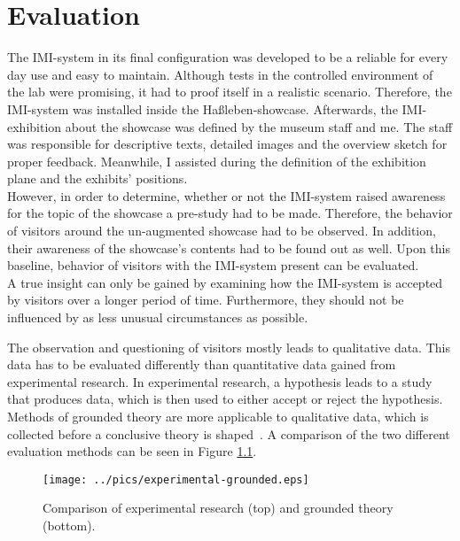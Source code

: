 \chapter{Evaluation}
\label{evaluation}

The \ac{IMI}-system in its final configuration was developed to be a reliable for every day use and easy to maintain. Although tests in the controlled environment of the lab were promising, it had to proof itself in a realistic scenario. Therefore, the \ac{IMI}-system was installed inside the Haßleben-showcase. Afterwards, the \ac{IMI}-exhibition about the showcase was defined by the museum staff and me. The staff was responsible for descriptive texts, detailed images and the overview sketch for proper feedback. Meanwhile, I assisted during the definition of the exhibition plane and the exhibits' positions.
\\
However, in order to determine, whether or not the \ac{IMI}-system raised awareness for the topic of the showcase a pre-study had to be made. Therefore, the behavior of visitors around the un-augmented showcase had to be observed. In addition, their awareness of the showcase's contents had to be found out as well. Upon this baseline, behavior of visitors with the \ac{IMI}-system present can be evaluated.
\\
A true insight can only be gained by examining how the \ac{IMI}-system is accepted by visitors over a longer period of time. Furthermore, they should not be influenced by as less unusual circumstances as possible.

The observation and questioning of visitors mostly leads to qualitative data. This data has to be evaluated differently than quantitative data gained from experimental research. In experimental research, a hypothesis leads to a study that produces data, which is then used to either accept or reject the hypothesis. Methods of grounded theory are more applicable to qualitative data, which is collected before a conclusive theory is shaped~\cite{GroundedTheory}. A comparison of the two different evaluation methods can be seen in Figure \ref{fig:experiment_vs_grounded}.
\begin{figure}[H]%
\texttt{[image: ../pics/experimental-grounded.eps]}%
\caption{Comparison of experimental research (top) and grounded theory (bottom).~\cite{GroundedTheory}}
\label{fig:experiment_vs_grounded} %
\end{figure}
 
